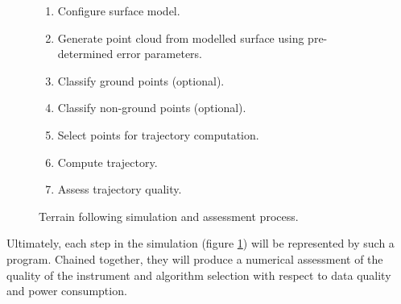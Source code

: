 \documentclass[10pt]{article}
\begin{document}
\begin{figure}
\begin{enumerate}
\item Configure surface model.
\item Generate point cloud from modelled surface using pre-determined error parameters.
\item Classify ground points (optional).
\item Classify non-ground points (optional).
\item Select points for trajectory computation.
\item Compute trajectory.
\item Assess trajectory quality.
\end{enumerate}
\caption{Terrain following simulation and assessment process.}
\label{fig:traj_sim}
\end{figure}

Ultimately, each step in the simulation (figure \ref{fig:traj_sim}) will be represented by such a program. Chained together, they will produce a numerical assessment of the quality of the instrument and algorithm selection with respect to data quality and power consumption.



\end{document}
